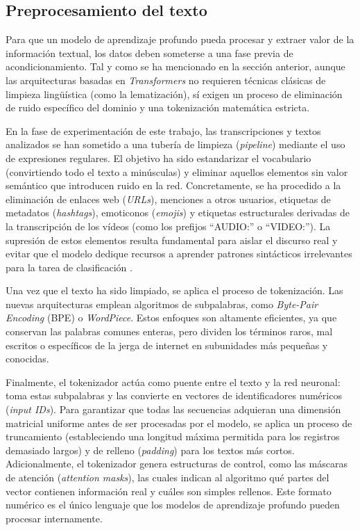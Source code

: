 \subsection{Preprocesamiento del texto}
\label{subsec:Preprocesamiento}
Para que un modelo de aprendizaje profundo pueda procesar y extraer valor de la información textual, los datos deben someterse a una fase previa de acondicionamiento. Tal y como se ha mencionado en la sección anterior, aunque las arquitecturas basadas en \textit{Transformers} no requieren técnicas clásicas de limpieza lingüística (como la lematización), sí exigen un proceso de  eliminación de ruido específico del dominio y una tokenización matemática estricta. 

En la fase de experimentación de este trabajo, las transcripciones y textos analizados se han sometido a una tubería de limpieza (\textit{pipeline}) mediante el uso de expresiones regulares. El objetivo ha sido estandarizar el vocabulario (convirtiendo todo el texto a minúsculas) y eliminar aquellos elementos sin valor semántico que introducen ruido en la red. Concretamente, se ha procedido a la eliminación de enlaces web (\textit{URLs}), menciones a otros usuarios, etiquetas de metadatos (\textit{hashtags}), emoticonos (\textit{emojis}) y etiquetas estructurales derivadas de la transcripción de los vídeos (como los prefijos ``AUDIO:'' o ``VIDEO:''). La supresión de estos elementos resulta fundamental para aislar el discurso real y evitar que el modelo dedique recursos a aprender patrones sintácticos irrelevantes para la tarea de clasificación \cite{khurana2023natural}.

Una vez que el texto ha sido limpiado, se aplica el proceso de tokenización. Las nuevas arquitecturas emplean algoritmos de subpalabras, como \textit{Byte-Pair Encoding} (BPE) o \textit{WordPiece}. Estos enfoques son altamente eficientes, ya que conservan las palabras comunes enteras, pero dividen los términos raros, mal escritos o específicos de la jerga de internet en subunidades más pequeñas y conocidas. 

Finalmente, el tokenizador actúa como puente entre el texto y la red neuronal: toma estas subpalabras y las convierte en vectores de identificadores numéricos (\textit{input IDs}). Para garantizar que todas las secuencias adquieran una dimensión matricial uniforme antes de ser procesadas por el modelo, se aplica un proceso de truncamiento (estableciendo una longitud máxima permitida para los registros demasiado largos) y de relleno (\textit{padding}) para los textos más cortos. Adicionalmente, el tokenizador genera estructuras de control, como las máscaras de atención (\textit{attention masks}), las cuales indican al algoritmo qué partes del vector contienen información real y cuáles son simples rellenos. Este formato numérico es el único lenguaje que los modelos de aprendizaje profundo pueden procesar internamente. 

